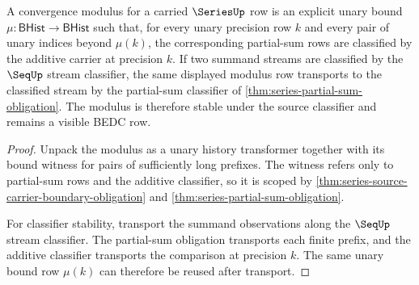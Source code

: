 \begin{theorem}
\label{thm:series-modulus-stability-obligation}
A convergence modulus for a carried $\SeriesUp$ row is an explicit unary bound $\mu:\mathsf{BHist}\to\mathsf{BHist}$ such that, for every unary precision row $k$ and every pair of unary indices beyond $\mu(k)$, the corresponding partial-sum rows are classified by the additive carrier at precision $k$. If two summand streams are classified by the $\SeqUp$ stream classifier, the same displayed modulus row transports to the classified stream by the partial-sum classifier of \autoref{thm:series-partial-sum-obligation}. The modulus is therefore stable under the source classifier and remains a visible BEDC row.
\end{theorem}
\begin{proof}
Unpack the modulus as a unary history transformer together with its bound witness for pairs of sufficiently long prefixes. The witness refers only to partial-sum rows and the additive classifier, so it is scoped by \autoref{thm:series-source-carrier-boundary-obligation} and \autoref{thm:series-partial-sum-obligation}.

For classifier stability, transport the summand observations along the $\SeqUp$ stream classifier. The partial-sum obligation transports each finite prefix, and the additive classifier transports the comparison at precision $k$. The same unary bound row $\mu(k)$ can therefore be reused after transport.
\end{proof}

